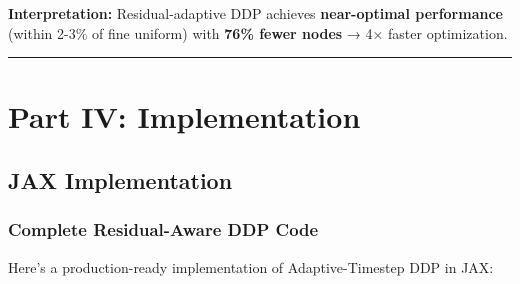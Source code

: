 \documentclass[
  letterpaper,
  DIV=11,
  numbers=noendperiod]{scrartcl}
\begin{document}
\textbf{Interpretation:} Residual-adaptive DDP achieves
\textbf{near-optimal performance} (within 2-3\% of fine uniform) with
\textbf{76\% fewer nodes} → 4× faster optimization.

\begin{center}\rule{0.5\linewidth}{0.5pt}\end{center}

\section{Part IV: Implementation}\label{sec-implementation}

\subsection{JAX Implementation}\label{sec-jax}

\subsubsection{Complete Residual-Aware DDP
Code}\label{complete-residual-aware-ddp-code}

Here's a production-ready implementation of Adaptive-Timestep DDP in
JAX:
\end{document}
